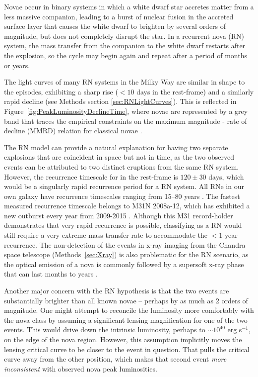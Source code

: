 Novae occur in binary systems in which a white dwarf star accretes
matter from a less massive companion, leading to a burst of nuclear
fusion in the accreted surface layer that causes the white dwarf to
brighten by several orders of magnitude, but does not completely
disrupt the star. In a recurrent nova (RN) system, the mass transfer
from the companion to the white dwarf restarts after the explosion, so
the cycle may begin again and repeat after a period of months or
years.

The light curves of many RN systems in the Milky Way are similar in
shape to the \spock episodes, exhibiting a sharp rise ($<10$ days in
the rest-frame) and a similarly rapid decline (see Methods section
\ref{sec:RNLightCurves}).  This is reflected in
Figure~\ref{fig:PeakLuminosityDeclineTime}, where novae are
represented by a grey band that traces the empirical constraints on
the maximum magnitude - rate of decline (MMRD) relation for classical
novae \citep{DellaValle:1995, Downes:2000, Shafter:2011,
  Kasliwal:2011a}.

The RN model can provide a natural explanation for having two separate
explosions that are coincident in space but not in time, as the two
observed \spock events can be attributed to two distinct eruptions
from the same RN system.  However, the recurrence timescale for \spock
in the rest-frame is $120\pm30$ days, which would be a singularly
rapid recurrence period for a RN system.  All RNe in our own galaxy
have recurrence timescales ranging from 15--80 years
\citep{Schaefer:2010}.  The fastest measured recurrence timescale
belongs to M31N 2008a-12, which has
exhibited a new outburst every year from 2009-2015
\citep{Tang:2014,Darnley:2014,Darnley:2015,Henze:2015,Henze:2015a}. Although
this M31 record-holder demonstrates that very rapid recurrence is
possible, classifying \spock as a RN would still require a very
extreme mass transfer rate to accommodate the $<1$ year recurrence.
The non-detection of the \spock events in x-ray imaging from the
Chandra space telescope (Methods~\ref{sec:Xray}) is also problematic
for the RN scenario, as the optical emission of a nova is commonly
followed by a supersoft x-ray phase that can last months to years
\citep[e.g.]{Hachisu:2006}.

Another major concern with the RN hypothesis is that the
two \spock events are substantially brighter than all known novae --
perhaps by as much as 2 orders of magnitude.  One might attempt to
reconcile the \spock luminosity more comfortably with the nova class
by assuming a significant lensing magnification for one of the two
events. This would drive down the intrinsic luminosity, perhaps to
$\sim10^{40}$ erg s$^{-1}$, on the edge of the nova region.  However,
this assumption implicitly moves the lensing critical curve to be
closer to the \spock event in question.  That pulls the critical curve
away from the other \spock position, which makes that second event
{\it more inconsistent} with observed nova peak luminosities.  

